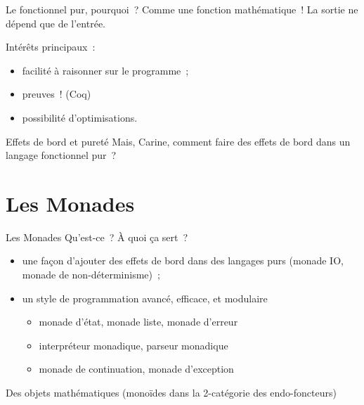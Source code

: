 \documentclass[10pt]{beamer}
\begin{document}
\begin{frame}{Le fonctionnel pur, pourquoi~?}
  Comme une fonction mathématique~! La sortie ne dépend que de
  l'entrée.

  Intérêts principaux~:
  \begin{itemize}
  \item facilité à raisonner sur le programme~;
  \item preuves~! (Coq)
  \item possibilité d'optimisations.
  \end{itemize}
\end{frame}

\begin{frame}{Effets de bord et pureté}
  Mais, Carine, comment faire des effets de bord dans un langage
  fonctionnel pur~?
\end{frame}

\section{Les Monades}

\begin{frame}{Les Monades}
  Qu'est-ce~? À quoi ça sert~?
  \begin{itemize}
  \item une façon d’ajouter des effets de bord dans des langages purs
    (monade IO, monade de non-déterminisme)~;
  \item un style de programmation avancé, efficace, et modulaire
    \begin{itemize}
    \item monade d'état, monade liste, monade d'erreur
    \item interpréteur monadique, parseur monadique
    \item monade de continuation, monade d'exception
    \end{itemize}
  \end{itemize}

  Des objets mathématiques (monoïdes dans la 2-catégorie des
  endo-foncteurs)
\end{frame}
\end{document}
